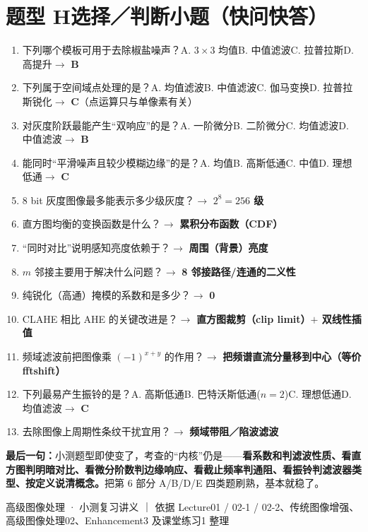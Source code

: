 \section*{题型 H\quad 选择／判断小题（快问快答）}
\begin{enumerate}[leftmargin=*,label=\arabic*.]
\item 下列哪个模板可用于去除椒盐噪声？\quad A. $3\times3$ 均值\quad B. 中值滤波\quad C. 拉普拉斯\quad D. 高提升\quad $\to$ \textbf{B}
\item 下列属于空间域点处理的是？\quad A. 均值滤波\quad B. 中值滤波\quad C. 伽马变换\quad D. 拉普拉斯锐化\quad $\to$ \textbf{C}（点运算只与单像素有关）
\item 对灰度阶跃最能产生“双响应”的是？\quad A. 一阶微分\quad B. 二阶微分\quad C. 均值滤波\quad D. 中值滤波\quad $\to$ \textbf{B}
\item 能同时“平滑噪声且较少模糊边缘”的是？\quad A. 均值\quad B. 高斯低通\quad C. 中值\quad D. 理想低通\quad $\to$ \textbf{C}
\item 8 bit 灰度图像最多能表示多少级灰度？\quad $\to$ \textbf{$2^8=256$ 级}
\item 直方图均衡的变换函数是什么？\quad $\to$ \textbf{累积分布函数（CDF）}
\item “同时对比”说明感知亮度依赖于？\quad $\to$ \textbf{周围（背景）亮度}
\item $m$ 邻接主要用于解决什么问题？\quad $\to$ \textbf{8 邻接路径/连通的二义性}
\item 纯锐化（高通）掩模的系数和是多少？\quad $\to$ \textbf{0}
\item CLAHE 相比 AHE 的关键改进是？\quad $\to$ \textbf{直方图裁剪（clip limit）$+$ 双线性插值}
\item 频域滤波前把图像乘 $(-1)^{x+y}$ 的作用？\quad $\to$ \textbf{把频谱直流分量移到中心（等价 fftshift）}
\item 下列最易产生振铃的是？\quad A. 高斯低通\quad B. 巴特沃斯低通($n=2$)\quad C. 理想低通\quad D. 均值滤波\quad $\to$ \textbf{C}
\item 去除图像上周期性条纹干扰宜用？\quad $\to$ \textbf{频域带阻／陷波滤波}
\end{enumerate}

\medskip
\textbf{最后一句：}小测题型即使变了，考查的“内核”仍是——\textbf{看系数和判滤波性质、看直方图判明暗对比、看微分阶数判边缘响应、看截止频率判通阻、看振铃判滤波器类型、按定义说清概念。}把第 6 部分 A/B/D/E 四类题刷熟，基本就稳了。

\begin{center}\small
高级图像处理 · 小测复习讲义 ｜ 依据 Lecture01 / 02-1 / 02-2、传统图像增强、高级图像处理02、Enhancement3 及课堂练习1 整理
\end{center}
